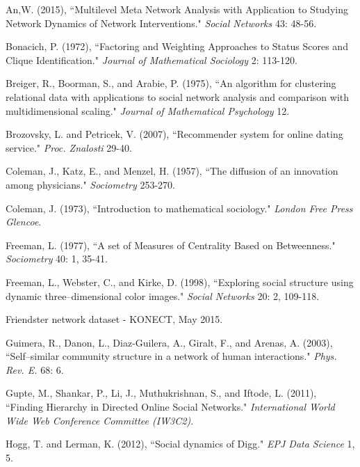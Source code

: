 \documentclass[3p,times]{elsarticle}
\begin{document}

\begin{thebibliography}{9}
	An,W. (2015),
	``Multilevel Meta Network Analysis with Application to Studying Network Dynamics of Network Interventions." \textit{Social Networks} 43: 48-56.
	
	Bonacich, P. (1972),
	``Factoring and Weighting Approaches to Status Scores and Clique Identification." 
	\textit{Journal of Mathematical Sociology} 2: 113-120.
	
	Breiger, R., Boorman, S., and Arabie, P. (1975),
	``An algorithm for clustering relational data with applications to social network analysis and comparison with multidimensional scaling."
	\textit{Journal of Mathematical Psychology} 12.
	
	Brozovsky, L. and Petricek, V. (2007),
	``Recommender system for online dating service."
	\textit{Proc. Znalosti} 29-40.
	
	Coleman, J., Katz, E., and Menzel, H. (1957),
	``The diffusion of an innovation among physicians."
	\textit{Sociometry} 253-270.
	
	Coleman, J. (1973),
	``Introduction to mathematical sociology."
	\textit{London Free Press Glencoe}.
	
	Freeman, L. (1977),
	``A set of Measures of Centrality Based on Betweenness." 
	\textit{Sociometry} 40: 1, 35-41.
	
	Freeman, L., Webster, C., and Kirke, D. (1998),
	``Exploring social structure using dynamic three--dimensional color images."
	\textit{Social Networks} 20: 2, 109-118.
	
	Friendster network dataset - KONECT, May 2015.
	
	Guimera, R., Danon, L., Diaz-Guilera, A., Giralt, F., and Arenas, A. (2003),
	``Self--similar community structure in a network of human interactions."
	\textit{Phys. Rev. E.} 68: 6.
	
	Gupte, M., Shankar, P., Li, J., Muthukrishnan, S., and Iftode, L. (2011),
	``Finding Hierarchy in Directed Online Social Networks." 
	\textit{International World Wide Web Conference Committee (IW3C2)}.
	
	Hogg, T. and Lerman, K. (2012),
	``Social dynamics of Digg."
	\textit{EPJ Data Science} 1, 5.
	

\end{thebibliography}
\end{document}

